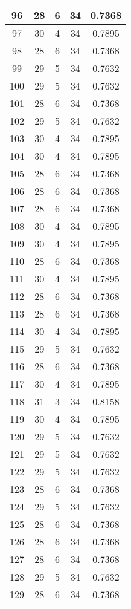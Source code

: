 \documentclass[letterpaper, 12pt]{article}
\begin{document}
\begin{longtable}{|c|c|c|c|c|}
\hline
96 & 28 & 6 & 34 & 0.7368 \\
\hline
97 & 30 & 4 & 34 & 0.7895 \\
\hline
98 & 28 & 6 & 34 & 0.7368 \\
\hline
99 & 29 & 5 & 34 & 0.7632 \\
\hline
100 & 29 & 5 & 34 & 0.7632 \\
\hline
101 & 28 & 6 & 34 & 0.7368 \\
\hline
102 & 29 & 5 & 34 & 0.7632 \\
\hline
103 & 30 & 4 & 34 & 0.7895 \\
\hline
104 & 30 & 4 & 34 & 0.7895 \\
\hline
105 & 28 & 6 & 34 & 0.7368 \\
\hline
106 & 28 & 6 & 34 & 0.7368 \\
\hline
107 & 28 & 6 & 34 & 0.7368 \\
\hline
108 & 30 & 4 & 34 & 0.7895 \\
\hline
109 & 30 & 4 & 34 & 0.7895 \\
\hline
110 & 28 & 6 & 34 & 0.7368 \\
\hline
111 & 30 & 4 & 34 & 0.7895 \\
\hline
112 & 28 & 6 & 34 & 0.7368 \\
\hline
113 & 28 & 6 & 34 & 0.7368 \\
\hline
114 & 30 & 4 & 34 & 0.7895 \\
\hline
115 & 29 & 5 & 34 & 0.7632 \\
\hline
116 & 28 & 6 & 34 & 0.7368 \\
\hline
117 & 30 & 4 & 34 & 0.7895 \\
\hline
118 & 31 & 3 & 34 & 0.8158 \\
\hline
119 & 30 & 4 & 34 & 0.7895 \\
\hline
120 & 29 & 5 & 34 & 0.7632 \\
\hline
121 & 29 & 5 & 34 & 0.7632 \\
\hline
122 & 29 & 5 & 34 & 0.7632 \\
\hline
123 & 28 & 6 & 34 & 0.7368 \\
\hline
124 & 29 & 5 & 34 & 0.7632 \\
\hline
125 & 28 & 6 & 34 & 0.7368 \\
\hline
126 & 28 & 6 & 34 & 0.7368 \\
\hline
127 & 28 & 6 & 34 & 0.7368 \\
\hline
128 & 29 & 5 & 34 & 0.7632 \\
\hline
129 & 28 & 6 & 34 & 0.7368 \\

\end{longtable}
\end{document}
